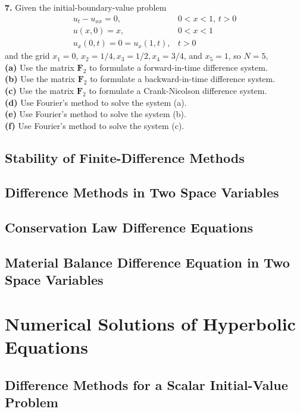 \documentclass{amsbook}%
\theoremstyle{plain}
\numberwithin{equation}{section}
\begin{document}
		\noindent\textbf{7.} Given the initial-boundary-value problem
		\begin{align}
			u_t-u_{xx}=0, & 0<x<1,\, t>0\\
			u(x,0)=x, & 0<x<1\\
			u_x(0,t)=0=u_x(1,t), & t>0
		\end{align}
		and the grid $x_1=0$, $x_2=1/4, x_3=1/2, x_4=3/4$, and $x_5=1$, so $N=5$,\\
		\textbf{(a)} Use the matrix $\mathbf{F}_2$ to formulate a forward-in-time difference system.\\
		\textbf{(b)} Use the matrix $\mathbf{F}_2$ to formulate a backward-in-time difference system.\\
		\textbf{(c)} Use the matrix $\mathbf{F}_2$ to formulate a Crank-Nicolson difference system.\\
		\textbf{(d)} Use Fourier's method to solve the system (a).\\
		\textbf{(e)} Use Fourier's method to solve the system (b).\\
		\textbf{(f)} Use Fourier's method to solve the system (c).\\[12pt]
		
	\section{Stability of Finite-Difference Methods}
	
	\section{Difference Methods in Two Space Variables}
	
	\section{Conservation Law Difference Equations}
	
	\section{Material Balance Difference Equation in Two Space Variables}
		
\chapter{Numerical Solutions of Hyperbolic Equations}

	\section{Difference Methods for a Scalar Initial-Value Problem}
\end{document}
